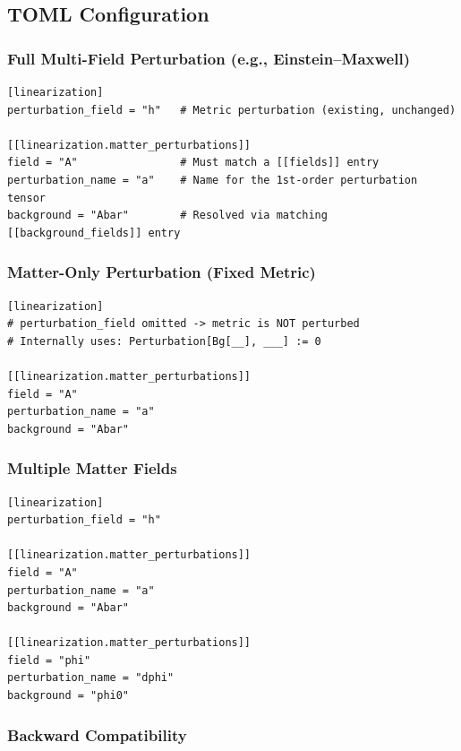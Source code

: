 \subsection{TOML Configuration}
\label{sec:mfp-toml}

\subsubsection{Full Multi-Field Perturbation (e.g., Einstein--Maxwell)}
\label{sec:mfp-toml-full}

\begin{lstlisting}[style=toml]
[linearization]
perturbation_field = "h"   # Metric perturbation (existing, unchanged)

[[linearization.matter_perturbations]]
field = "A"                # Must match a [[fields]] entry
perturbation_name = "a"    # Name for the 1st-order perturbation tensor
background = "Abar"        # Resolved via matching [[background_fields]] entry
\end{lstlisting}

\subsubsection{Matter-Only Perturbation (Fixed Metric)}
\label{sec:mfp-toml-matter-only}

\begin{lstlisting}[style=toml]
[linearization]
# perturbation_field omitted -> metric is NOT perturbed
# Internally uses: Perturbation[Bg[__], ___] := 0

[[linearization.matter_perturbations]]
field = "A"
perturbation_name = "a"
background = "Abar"
\end{lstlisting}

\subsubsection{Multiple Matter Fields}
\label{sec:mfp-toml-multiple}

\begin{lstlisting}[style=toml]
[linearization]
perturbation_field = "h"

[[linearization.matter_perturbations]]
field = "A"
perturbation_name = "a"
background = "Abar"

[[linearization.matter_perturbations]]
field = "phi"
perturbation_name = "dphi"
background = "phi0"
\end{lstlisting}

\subsubsection{Backward Compatibility}
\label{sec:mfp-toml-backward}

